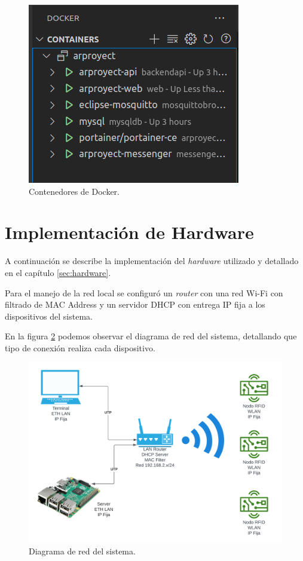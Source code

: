 \begin{figure}[H]
	\centering
	\includegraphics[scale=.60]{./Figures/docker-interfaz.png}
	\caption{Contenedores de Docker.}
	\label{fig:docker-interfaz}
\end{figure}

\section{Implementación de Hardware}
\label{sec:implementacionhw}

A continuación se describe la implementación del \textit{hardware} utilizado y detallado en el capítulo \ref{sec:hardware}.

Para el manejo de la red local se configuró un \textit{router} con una red Wi-Fi con filtrado de MAC Address y un servidor DHCP con entrega IP fija a los dispositivos del sistema.

En la figura \ref{fig:diagramared} podemos observar el diagrama de red del sistema, detallando que tipo de conexión realiza cada dispositivo.

\begin{figure}[H]
	\centering
	\includegraphics[scale=.10]{./Figures/diagrama-red.png}
	\caption{Diagrama de red del sistema.}
	\label{fig:diagramared}
\end{figure}

